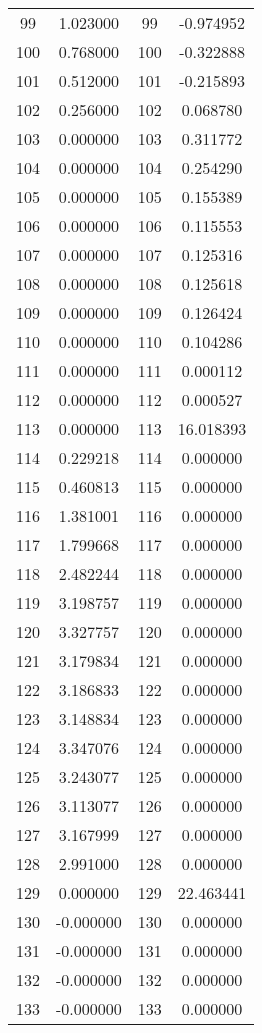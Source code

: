 \documentclass[12pt]{article}
\begin{document}
\begin{longtable}{@{}cccc@{}}
99 & 1.023000 & 99 & -0.974952 \\
100 & 0.768000 & 100 & -0.322888 \\
101 & 0.512000 & 101 & -0.215893 \\
102 & 0.256000 & 102 & 0.068780 \\
103 & 0.000000 & 103 & 0.311772 \\
104 & 0.000000 & 104 & 0.254290 \\
105 & 0.000000 & 105 & 0.155389 \\
106 & 0.000000 & 106 & 0.115553 \\
107 & 0.000000 & 107 & 0.125316 \\
108 & 0.000000 & 108 & 0.125618 \\
109 & 0.000000 & 109 & 0.126424 \\
110 & 0.000000 & 110 & 0.104286 \\
111 & 0.000000 & 111 & 0.000112 \\
112 & 0.000000 & 112 & 0.000527 \\
113 & 0.000000 & 113 & 16.018393 \\
114 & 0.229218 & 114 & 0.000000 \\
115 & 0.460813 & 115 & 0.000000 \\
116 & 1.381001 & 116 & 0.000000 \\
117 & 1.799668 & 117 & 0.000000 \\
118 & 2.482244 & 118 & 0.000000 \\
119 & 3.198757 & 119 & 0.000000 \\
120 & 3.327757 & 120 & 0.000000 \\
121 & 3.179834 & 121 & 0.000000 \\
122 & 3.186833 & 122 & 0.000000 \\
123 & 3.148834 & 123 & 0.000000 \\
124 & 3.347076 & 124 & 0.000000 \\
125 & 3.243077 & 125 & 0.000000 \\
126 & 3.113077 & 126 & 0.000000 \\
127 & 3.167999 & 127 & 0.000000 \\
128 & 2.991000 & 128 & 0.000000 \\
129 & 0.000000 & 129 & 22.463441 \\
130 & -0.000000 & 130 & 0.000000 \\
131 & -0.000000 & 131 & 0.000000 \\
132 & -0.000000 & 132 & 0.000000 \\
133 & -0.000000 & 133 & 0.000000 \\

\end{longtable}
\end{document}
